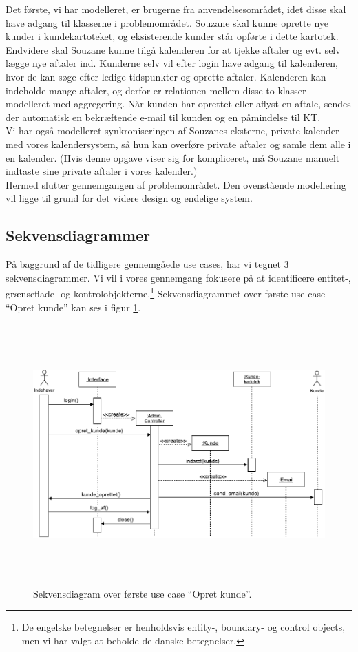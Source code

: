 \documentclass[12pt]{article}   %
\begin{document}
Det første, vi har modelleret, er brugerne fra anvendelsesområdet, idet disse skal have adgang til klasserne i problemområdet. Souzane skal kunne oprette nye kunder i kundekartoteket, og eksisterende kunder står opførte i dette kartotek. Endvidere skal Souzane kunne tilgå kalenderen for at tjekke aftaler og evt. selv lægge nye aftaler ind. Kunderne selv vil efter login have adgang til kalenderen, hvor de kan søge efter ledige tidspunkter og oprette aftaler. Kalenderen kan indeholde mange aftaler, og derfor er relationen mellem disse to klasser modelleret med aggregering. Når kunden har oprettet eller aflyst en aftale, sendes der automatisk en bekræftende e-mail til kunden og en påmindelse til KT. \\
Vi har også modelleret synkroniseringen af Souzanes eksterne, private kalender med vores kalendersystem, så hun kan overføre private aftaler og samle dem alle i en kalender. (Hvis denne opgave viser sig for kompliceret, må Souzane manuelt indtaste sine private aftaler i vores kalender.) \\
\indent Hermed slutter gennemgangen af problemområdet. Den ovenstående modellering vil ligge til grund for det videre design og endelige system. 

\subsection{Sekvensdiagrammer}

På baggrund af de tidligere gennemgåede use cases, har vi tegnet 3 sekvensdiagrammer. Vi vil i vores gennemgang fokusere på at identificere entitet-, grænseflade- og kontrolobjekterne.\footnote{De engelske betegnelser er henholdsvis entity-, boundary- og control objects, men vi har valgt at beholde de danske betegnelser.} Sekvensdiagrammet over første use case ``Opret kunde'' kan ses i figur \ref{fig:opret}. \\

\begin{figure}[!ht]
\includegraphics[width=14cm, height=10cm]{seqtwo.pdf}
\caption{Sekvensdiagram over første use case ``Opret kunde''.}
\label{fig:opret}
\end{figure}
\end{document}
